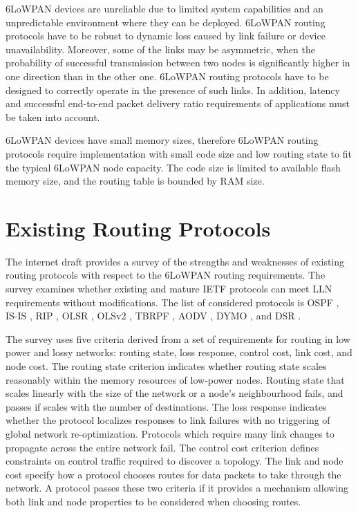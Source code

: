 6LoWPAN devices are unreliable due to limited system capabilities and an unpredictable environment where they can be deployed. 6LoWPAN routing protocols have to be robust to dynamic loss caused by link failure or device unavailability. Moreover, some of the links may be asymmetric, when the probability of successful transmission between two nodes is significantly higher in one direction than in the other one. 6LoWPAN routing protocols have to be designed to correctly operate in the presence of such links.  In addition, latency and successful end-to-end packet delivery ratio requirements of applications must be taken into account.

6LoWPAN devices have small memory sizes, therefore 6LoWPAN routing protocols require implementation with small code size and low routing state to fit the typical 6LoWPAN node capacity. The code size is limited to available flash memory size, and the routing table is bounded by RAM size. 

\section{Existing Routing Protocols}\label{sec:rout.protocols}
The internet draft \cite{draft-protocols-07} provides a survey of the strengths and weaknesses of existing routing protocols with respect to the 6LoWPAN routing requirements. The survey examines whether existing and mature IETF protocols can meet LLN requirements without modifications. The list of considered protocols is OSPF \cite{rfc2328}, IS-IS \cite{rfc1142}, RIP \cite{rfc2453}, OLSR \cite{rfc3626}, OLSv2 \cite{draft-manet-olsrv2}, TBRPF \cite{rfc3684}, AODV \cite{rfc3561}, DYMO \cite{draft-manet-dymo}, and DSR \cite{rfc4728}. 

The survey uses five criteria derived from a set of requirements for routing in low power and lossy networks:  routing state, loss response, control cost, link cost, and node cost. The routing state criterion indicates whether routing state scales reasonably within the memory resources of low-power nodes. Routing state that scales linearly with the size of the network or a node's neighbourhood fails, and passes if scales with the number of destinations. The loss response indicates whether the protocol localizes responses to link failures with no triggering of global network re-optimization. Protocols which require many link changes to propagate across the entire network fail. The control cost criterion defines constraints on control traffic required to discover a topology. The link and node cost specify how a protocol chooses routes for data packets to take through the network. A protocol passes these two criteria if it provides a mechanism allowing both link and node properties to be considered when choosing routes.

